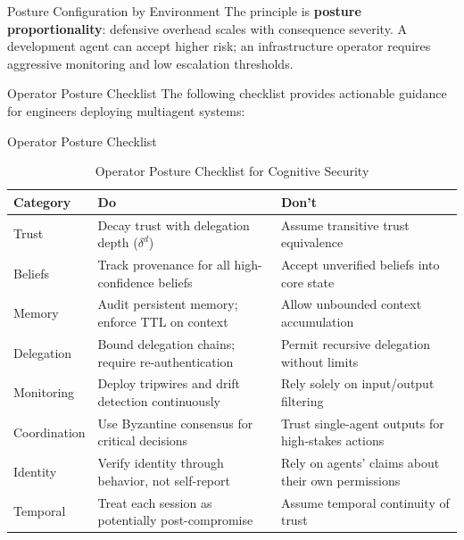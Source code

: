 \documentclass[
  ignorenonframetext,
]{beamer}
\begin{document}
\begin{frame}[allowframebreaks]{Posture Configuration by Environment}
The principle is \textbf{posture proportionality}: defensive overhead
scales with consequence severity. A development agent can accept higher
risk; an infrastructure operator requires aggressive monitoring and low
escalation thresholds.
\end{frame}

\begin{frame}[allowframebreaks]{Operator Posture Checklist}
\protect{}\label{operator-posture-checklist}
The following checklist provides actionable guidance for engineers
deploying multiagent systems:

\end{frame}

\begin{frame}[allowframebreaks]{Operator Posture Checklist}
\begin{table}[htbp]
\centering
\caption{Operator Posture Checklist for Cognitive Security}
\label{tab:posture-checklist}
\begin{tabular}{@{}lp{6cm}p{6cm}@{}}
\toprule
Category & \textbf{Do} & \textbf{Don't} \\
\midrule
Trust & Decay trust with delegation depth ($\delta^d$) & Assume transitive trust equivalence \\
Beliefs & Track provenance for all high-confidence beliefs & Accept unverified beliefs into core state \\
Memory & Audit persistent memory; enforce TTL on context & Allow unbounded context accumulation \\
Delegation & Bound delegation chains; require re-authentication & Permit recursive delegation without limits \\
Monitoring & Deploy tripwires and drift detection continuously & Rely solely on input/output filtering \\
Coordination & Use Byzantine consensus for critical decisions & Trust single-agent outputs for high-stakes actions \\
Identity & Verify identity through behavior, not self-report & Rely on agents' claims about their own permissions \\
Temporal & Treat each session as potentially post-compromise & Assume temporal continuity of trust \\
\bottomrule
\end{tabular}
\end{table}
\end{frame}
\end{document}
